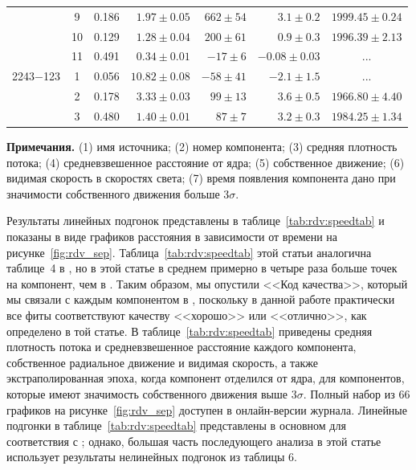 \begin{table}[tbh!]
\begin{SingleSpace}
\begin{tabular}{l c r r r r c}
         &  9 &  0.186 & $ 1.97\pm 0.05$ & $ 662\pm  54$ & $  3.1\pm 0.2$ & $1999.45\pm   0.24$ \\
         & 10 &  0.129 & $ 1.28\pm 0.04$ & $ 200\pm  61$ & $  0.9\pm 0.3$ & $1996.39\pm   2.13$ \\
         & 11 &  0.491 & $ 0.34\pm 0.01$ & $ -17\pm   6$ & $ -0.08\pm 0.03$ & ... \\
2243$-$123 &  1 &  0.056 & $10.82\pm 0.08$ & $ -58\pm  41$ & $ -2.1\pm 1.5$ & ... \\
         &  2 &  0.178 & $ 3.33\pm 0.03$ & $  99\pm  13$ & $  3.6\pm 0.5$ & $1966.80\pm   4.40$ \\
         &  3 &  0.480 & $ 1.40\pm 0.01$ & $  87\pm   7$ & $  3.2\pm 0.3$ & $1984.25\pm   1.34$ \\

\bottomrule
\end{tabular}
\end{SingleSpace}
\textbf{Примечания.} (1) имя источника; (2) номер компонента; (3) средняя плотность потока;
(4) средневзвешенное расстояние от ядра; (5) собственное движение; (6) видимая скорость в скоростях
света; (7) время появления компонента дано при значимости собственного движения больше 3$\sigma$.
\end{table}

Результаты линейных подгонок представлены в таблице~\ref{tab:rdv:speedtab} и показаны в виде
графиков расстояния в зависимости от времени на рисунке~\ref{fig:rdv_sep}.
Таблица~\ref{tab:rdv:speedtab} этой статьи аналогична таблице~4 в \cite{Piner_2007}, но в этой
статье в среднем примерно в четыре раза больше точек на компонент, чем в \cite{Piner_2007}. Таким
образом, мы опустили <<Код качества>>, который мы связали с каждым компонентом в \cite{Piner_2007},
поскольку в данной работе практически все фиты соответствуют качеству <<хорошо>> или <<отлично>>,
как определено в той статье. В таблице~\ref{tab:rdv:speedtab} приведены средняя плотность потока и
средневзвешенное расстояние каждого компонента, собственное радиальное движение и видимая скорость,
а также экстраполированная эпоха, когда компонент отделился от ядра, для компонентов, которые имеют
значимость собственного движения выше $3\sigma$. Полный набор из 66 графиков на
рисунке~\ref{fig:rdv_sep} доступен в онлайн-версии журнала. Линейные подгонки в
таблице~\ref{tab:rdv:speedtab} представлены в основном для соответствия с \cite{Piner_2007}; однако,
большая часть последующего анализа в этой статье использует результаты нелинейных подгонок из
таблицы 6.

